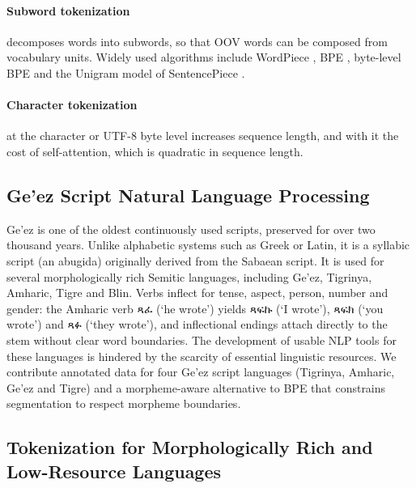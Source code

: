 \documentclass[11pt]{article}
\newcommand{\eth}[1]{{\ethiopicfont #1}}
\begin{document}
\paragraph{Subword tokenization} decomposes words into subwords, so that OOV
words can be composed from vocabulary units. Widely used algorithms include
WordPiece \citep{schuster2012japanese}, BPE \citep{sennrich-etal-2016-neural},
byte-level BPE and the Unigram model of SentencePiece
\citep{kudo-richardson-2018-sentencepiece}.

\paragraph{Character tokenization} at the character or UTF-8 byte level
increases sequence length, and with it the cost of self-attention, which is
quadratic in sequence length.

\subsection{Ge'ez Script Natural Language Processing}

Ge'ez is one of the oldest continuously used scripts, preserved for over two
thousand years. Unlike alphabetic systems such as Greek or Latin, it is a
syllabic script (an abugida) originally derived from the Sabaean script. It is
used for several morphologically rich Semitic languages, including Ge'ez,
Tigrinya, Amharic, Tigre and Blin. Verbs inflect for tense, aspect, person,
number and gender: the Amharic verb \eth{ጻፈ} (`he wrote') yields \eth{ጻፍኩ} (`I wrote'),
\eth{ጻፍክ} (`you wrote') and \eth{ጻፉ} (`they wrote'), and inflectional endings attach
directly to the stem without clear word boundaries. The development of usable
NLP tools for these languages is hindered by the scarcity of essential
linguistic resources. We contribute annotated data for four Ge'ez script
languages (Tigrinya, Amharic, Ge'ez and Tigre) and a morpheme-aware
alternative to BPE that constrains segmentation to respect morpheme
boundaries.

\subsection{Tokenization for Morphologically Rich and Low-Resource Languages}
\end{document}
